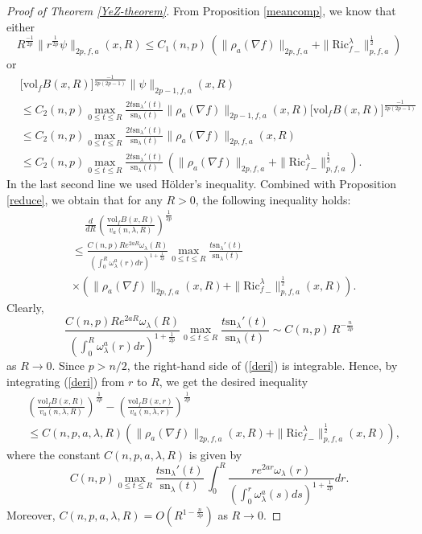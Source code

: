 \documentclass[11pt]{amsart}
\numberwithin{equation}{section}
\newcommand{\sn}{\mathrm{sn}}
\newcommand{\vol}{\mathrm{vol}}
\begin{document}
\begin{proof}[Proof of Theorem  \ref{YeZ-theorem}]
	From Proposition \ref{meancomp}, we know that either
	\[
	R^{\frac{-1}{2p}}\|r^{\frac{1}{2p}}\psi\|_{2p,f,a}(x,R)
	\le C_1(n,p)\,\left(\|\rho_a(\nabla f)\|_{2p,f,a}+\|{\mathrm{Ric}_f^\lambda}_-\|^{\frac{1}{2}}_{p,f,a}\right) 
	\]
	or
	\begin{align*}
	&\big[\vol_fB(x,R)\big]^{\frac{-1}{2p(2p-1)}}\|\psi\|_{2p-1,f,a}(x,R)\\
	&\le C_2(n,p)\max_{0\leq t\leq R}\frac{2t\sn_\lambda'(t)}{\sn_\lambda(t)}\|\rho_a(\nabla f)\|_{2p-1,f,a}(x,R)\big[\vol_fB(x,R)\big]^{\frac{-1}{2p(2p-1)}}\\
	&\le C_2(n,p)\max_{0\leq t\leq R}\frac{2t\sn_\lambda'(t)}{\sn_\lambda(t)}\|\rho_a(\nabla f)\|_{2p,f,a}(x,R)\\
	&\le C_2(n,p)\max_{0\leq t\leq R}\frac{2t\sn_\lambda'(t)}{\sn_\lambda(t)}\,\left(\|\rho_a(\nabla f)\|_{2p,f,a}+\|{\mathrm{Ric}_f^\lambda}_-\|^{\frac{1}{2}}_{p,f,a}\right).
	\end{align*}
	In the last second line we used H\"{o}lder's inequality. Combined with Proposition \ref{reduce}, we obtain that for any $R>0$, the following inequality holds:
	\begin{equation}
		\begin{aligned}
			&\quad\,\frac{d}{dR}\left(\frac{\vol_fB(x,R)}{v_a(n,\lambda,R)}\right)^\frac{1}{2p}\\
			&\leq \frac{C(n,p)Re^{2aR}\omega_\lambda(R)}{\left(\int_{0}^R\omega^a_\lambda(r)dr\right)^{1+\frac{1}{2p}}}\max_{0\leq t\leq R}\frac{t\sn_\lambda'(t)}{\sn_\lambda(t)}\\
			&\times \left(\|\rho_a(\nabla f)\|_{2p,f,a}(x,R)+\|{\mathrm{Ric}_f^\lambda}_-\|_{p,f,a}^{\frac{1}{2}}(x,R)\right).
		\end{aligned}\label{deri}
	\end{equation}
	Clearly, 
	\[
	\frac{C(n,p)Re^{2aR}\omega_\lambda(R)}{\left(\int_{0}^R\omega^a_\lambda(r)dr\right)^{1+\frac{1}{2p}}}\max_{0\leq t\leq R}\frac{t\sn_\lambda'(t)}{\sn_\lambda(t)}\sim C(n,p)\,R^{-\frac{n}{2p}}
	\]
	as $R\to 0$. Since $p>n/2$, the right-hand side of (\ref{deri}) is integrable. Hence, by integrating (\ref{deri}) from $r$ to $R$, we get the desired inequality
	\begin{equation*}
		\begin{aligned}
			&\left(\frac{\vol_f B(x,R)}{v_a(n,\lambda,R)}\right)^{\frac{1}{2p}}-\left(\frac{\vol_f B(x,r)}{v_a(n,\lambda,r)}\right)^{\frac{1}{2p}}\\
			&\leq
			C(n,p,a,\lambda,R)\left(\|\rho_a(\nabla f)\|_{2p,f,a}(x,R)+\|{\mathrm{Ric}_f^\lambda}_-\|^{\frac{1}{2}}_{p,f,a}(x,R)\right),
		\end{aligned}
	\end{equation*}
 where the constant  $C(n,p,a,\lambda,R)$ is given by
 \begin{equation}
C(n,p)\max_{0\leq t\leq R}\frac{t\sn_\lambda'(t)}{\sn_\lambda(t)}\,\int_{0}^{R}\frac{re^{2ar}\omega_\lambda(r)}{\left(\int_{0}^{r}\omega_\lambda^a(s)ds\right)^{1+\frac{1}{2p}}}dr. \label{coeffi}
 \end{equation}
 Moreover,  $C(n,p,a,\lambda,R)=O(R^{1-\frac{n}{2p}})$ as $R\to 0$.
\end{proof}
\end{document}
